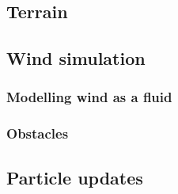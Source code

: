 \begin{figure}[ht]
\caption{}
\label{fig:back_snowsim_screenshots}
\end{figure}


\subsection{Terrain}

\subsection{Wind simulation}

\subsubsection{Modelling wind as a fluid}

\subsubsection{Obstacles}

\subsubsection{}

\subsection{Particle updates}

